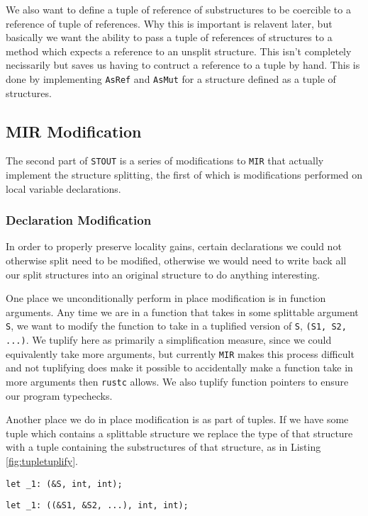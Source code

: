 \documentclass[prodmode,acmtecs]{acmsmall} %
\newcommand{\rustcname}{{\texttt{rustc}}}
\def \rustc {\rustcname{}\xspace}
\newcommand{\mirname}{{\texttt{MIR}}}
\def \mir {\mirname{}\xspace}
\newcommand{\projectname}{{\texttt{STOUT}}}
\def \name{\projectname\xspace}
\begin{document}
We also want to define a tuple of reference of substructures 
to be coercible to a reference of tuple of references. Why this is 
important is relavent later, but basically
we want the ability to pass a tuple of references 
of structures to a method which expects a reference to an 
unsplit structure. This isn't completely necissarily but 
saves us having to contruct a reference to a tuple by hand.
This is done by implementing \texttt{AsRef} and \texttt{AsMut}
for a structure defined as a tuple of structures.

\subsection{MIR Modification}

The second part of \name is a series of modifications to \mir that actually
implement the structure splitting, the first of which is modifications performed on
local variable declarations.

\subsubsection{Declaration Modification}
In order to properly preserve locality gains, certain declarations
we could not otherwise split need to be modified, otherwise we would need
to write back all our split structures into an original structure to
do anything interesting.

One place we unconditionally perform in place modification is in function
arguments. Any time we are in a function that takes in some splittable
argument \texttt{S}, we want to modify the function to take 
in a tuplified version of \texttt{S}, \texttt{(S1, S2, ...)}. 
We tuplify here as primarily a simplification measure, since 
we could equivalently take more arguments, but currently
\mir makes this process difficult and
not tuplifying does make it possible to accidentally make a function
take in more arguments then \rustc allows.
We also tuplify function pointers to ensure our program typechecks.

Another place we do in place modification is as part of tuples. If we have some
tuple which contains a splittable structure we replace the type of that
structure with a tuple containing the substructures of that structure, as 
in Listing \ref{fig:tupletuplify}.

\begin{figure*}[p]
  \begin{minipage}[t]{0.5\linewidth}
\begin{verbatim}
let _1: (&S, int, int);
\end{verbatim}
  \end{minipage}
  \begin{minipage}[t]{0.5\linewidth}
\begin{verbatim}
let _1: ((&S1, &S2, ...), int, int);
\end{verbatim}
  \end{minipage}
  \caption{Tuple Modification}
  \label{fig:tupletuplify}
\end{figure*}
\end{document}

